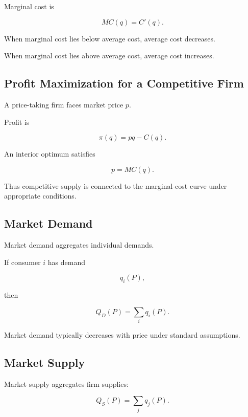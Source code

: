 Marginal cost is

\[
\boxed{
MC(q)
=
C'(q).
}
\]

When marginal cost lies below average cost, average cost decreases.

When marginal cost lies above average cost, average cost increases.

\subsection{Profit Maximization for a Competitive Firm}
\label{subsec:competitive-firm-profit}

A price-taking firm faces market price \(p\).

Profit is

\[
\boxed{
\pi(q)
=
pq-C(q).
}
\]

An interior optimum satisfies

\[
\boxed{
p=MC(q).
}
\]

Thus competitive supply is connected to the marginal-cost curve under
appropriate conditions.

\subsection{Market Demand}
\label{subsec:market-demand}

Market demand aggregates individual demands.

If consumer \(i\) has demand

\[
q_i(P),
\]

then

\[
\boxed{
Q_D(P)
=
\sum_iq_i(P).
}
\]

Market demand typically decreases with price under standard assumptions.

\subsection{Market Supply}
\label{subsec:market-supply}

Market supply aggregates firm supplies:

\[
\boxed{
Q_S(P)
=
\sum_jq_j(P).
}
\]

